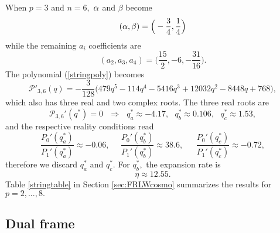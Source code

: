 \documentclass[amsmath,amssymb,11pt]{article}
\begin{document}
When $p=3$ and $n=6,$ $\alpha$ and $\beta$ become
\begin{equation}
(\alpha,\beta) = \Big(-\frac{3}{4},\frac{1}{4}\Big)
\end{equation}
while the remaining $a_i$ coefficients are
\begin{equation}
(a_2,a_3,a_4) = \Big(\frac{15}{2},-6,-\frac{31}{16}\Big). 
\end{equation}
The polynomial (\ref{stringpoly}) becomes
\begin{equation}
\mathcal{P}'_{3,6}(q)=-\frac{3}{128}\Big(479 q^5-114q^4-5416q^3+12032 q^2-8448q+768\Big),
\end{equation}
which also has three real and two complex roots. The three real roots are
\begin{equation}
\mathcal{P}_{3,6}'(q^*)=0 \ \ \ \Rightarrow \ \ \ q^*_a\approx -4.17, \ \ \ q^*_b\approx 0.106, \ \ \ q^*_c\approx 1.53,
\end{equation}
and the respective reality conditions read
\begin{equation}
\frac{P_0'(q^*_a)}{P_1'(q^*_a)}\approx -0.06, \ \ \ \ \ \ \frac{P_0'(q^*_b)}{P_1'(q^*_b)}\approx 38.6, \ \ \ \ \ \ \ \frac{P_0'(q^*_c)}{P_1'(q^*_c)}\approx -0.72,
\end{equation}
therefore we discard $q^*_a$ and $q^*_c.$ For $q^*_b,$ the expansion rate is 
\begin{equation}
\eta \approx 12.55.
\end{equation}
Table \ref{stringtable} in Section \ref{sec:FRLWcosmo} summarizes the results for $p=2,...,8.$





\subsection{Dual frame}\label{appen:dualframe}
\end{document}
